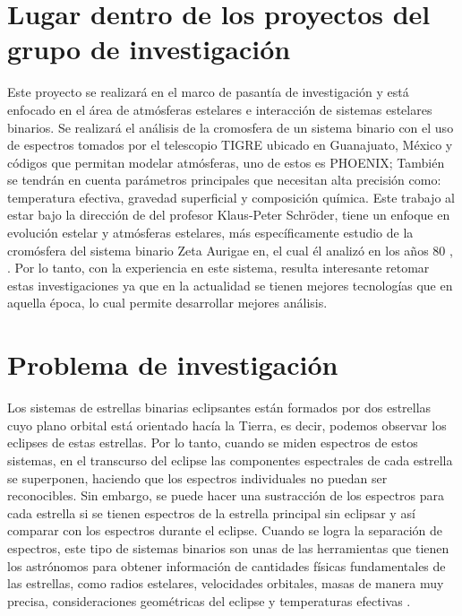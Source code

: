 \documentclass[11pt]{article}
\begin{document}
\section{Lugar dentro de los proyectos del grupo de investigación}
\noindent Este proyecto se realizará en el marco de pasantía de investigación y está enfocado en el área de atmósferas estelares e interacción de sistemas estelares binarios. Se realizará el análisis de la cromosfera de un sistema binario con el uso de espectros tomados por el telescopio TIGRE ubicado en Guanajuato, México y códigos que permitan modelar atmósferas, uno de estos es PHOENIX; También se tendrán en cuenta parámetros principales que necesitan alta precisión como: temperatura efectiva, gravedad superficial y composición química. Este trabajo al estar bajo la dirección de del profesor Klaus-Peter Schröder, tiene un enfoque en evolución estelar y atmósferas estelares, más específicamente estudio de la cromósfera del sistema binario Zeta Aurigae en, el cual él analizó en los años 80 \cite{kps9}, \cite{kps1O}. Por lo tanto, con la experiencia en este sistema, resulta interesante retomar estas investigaciones ya que en la actualidad se tienen mejores tecnologías que en aquella época, lo cual permite desarrollar mejores análisis.

\section{Problema de investigación}

\noindent Los sistemas de estrellas binarias eclipsantes están formados por dos estrellas cuyo plano orbital está orientado hacía la Tierra, es decir, podemos observar los eclipses de estas estrellas. Por lo tanto, cuando se miden espectros de estos sistemas, en el transcurso del eclipse las componentes espectrales de cada estrella se superponen, haciendo que los espectros individuales no puedan ser reconocibles. Sin embargo, se puede hacer una sustracción de los espectros para cada estrella si se tienen espectros de la estrella principal sin eclipsar y así comparar con los espectros durante el eclipse. Cuando se logra la separación de espectros, este tipo de sistemas binarios son unas de las herramientas que tienen los astrónomos para obtener información de cantidades físicas fundamentales de las estrellas, como radios estelares, velocidades orbitales, masas de manera muy precisa, consideraciones geométricas del eclipse y temperaturas efectivas \cite{schroder2009stars}.
\end{document}
